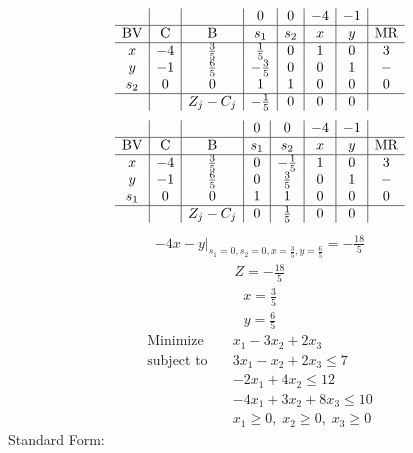 \documentclass{article}
\begin{document}
\begin{align*}
\begin{array}{c|c|c|c|c|c|c|c}
 &  &  & 0 & 0 & -4 & -1 & \\
\hline
\text{BV} & \text{C} & \text{B} & s_{1} & s_{2} & x & y & \text{MR} \\
\hline
x & -4 & \frac{3}{5} & \frac{1}{5} & 0 & 1 & 0 & 3 \\
y & -1 & \frac{6}{5} & -\frac{3}{5} & 0 & 0 & 1 & - \\
s_{2} & 0 & 0 & 1 & 1 & 0 & 0 & 0 \\
\hline
 &  & Z_j-C_j & -\frac{1}{5} & 0 & 0 & 0 & \\
\end{array}
\end{align*}
\begin{align*}
\begin{array}{c|c|c|c|c|c|c|c}
 &  &  & 0 & 0 & -4 & -1 & \\
\hline
\text{BV} & \text{C} & \text{B} & s_{1} & s_{2} & x & y & \text{MR} \\
\hline
x & -4 & \frac{3}{5} & 0 & -\frac{1}{5} & 1 & 0 & 3 \\
y & -1 & \frac{6}{5} & 0 & \frac{3}{5} & 0 & 1 & - \\
s_{1} & 0 & 0 & 1 & 1 & 0 & 0 & 0 \\
\hline
 &  & Z_j-C_j & 0 & \frac{1}{5} & 0 & 0 & \\
\end{array}
\end{align*}
\begin{align*}
\left.-4x - y\right|_{s_{1}=0,s_{2}=0,x=\frac{3}{5},y=\frac{6}{5}}=-\frac{18}{5}\end{align*}
\begin{align*}
Z=-\frac{18}{5}\end{align*}
\begin{align*}
x=\frac{3}{5}\end{align*}
\begin{align*}
y=\frac{6}{5}\end{align*}
\begin{align*}
\text{Minimize} \quad & x_{1} - 3x_{2} + 2x_{3}\\
\text{subject to} \quad
& 3x_{1} - x_{2} + 2x_{3}\le7\\
& -2x_{1} + 4x_{2}\le12\\
& -4x_{1} + 3x_{2} + 8x_{3}\le10\\
& x_{1}\ge0,\; x_{2}\ge0,\; x_{3}\ge0\end{align*}
Standard Form:\\
\end{document}
